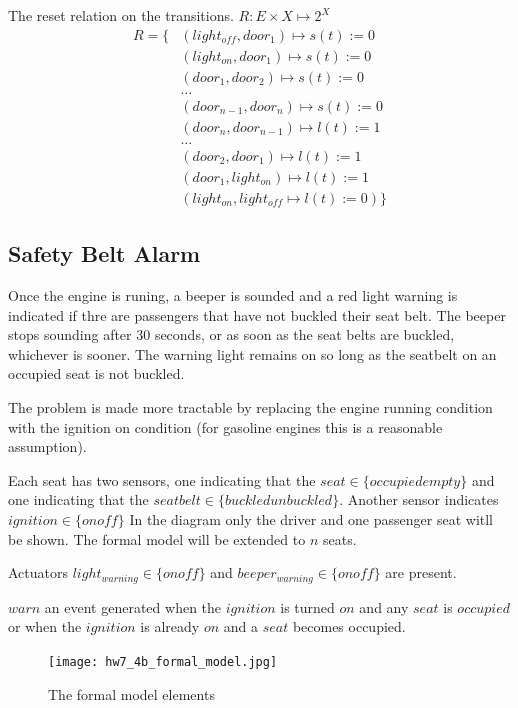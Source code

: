 \documentclass{article}
\begin{document}
The reset relation on the transitions.
$R: E \times X \mapsto 2^X$
\begin{align}
R = \{ & ( light_{off}, door_1 ) \mapsto s(t) := 0 \\
    & ( light_{on}, door_1 ) \mapsto  s(t) := 0 \\
    & ( door_1, door_2 ) \mapsto  s(t) := 0 \\
    & \ldots \\
    & ( door_{n-1}, door_n ) \mapsto  s(t) := 0 \\
    & ( door_n, door_{n-1} ) \mapsto l(t) := 1 \\
    & \ldots \\
    & ( door_2, door_1 ) \mapsto l(t) := 1 \\
    & ( door_1, light_{on} ) \mapsto l(t) := 1 \\
    & ( light_{on}, light_{off} \mapsto l(t) := 0 ) \}
\end{align}

\subsection{Safety Belt Alarm}
Once the engine is runing,
a beeper is sounded and
a red light warning is indicated if thre are
passengers that have not buckled their seat belt.
The beeper stops sounding after 30 seconds, or
as soon as the seat belts are buckled,
whichever is sooner.
The warning light remains on so long as the
seatbelt on an occupied seat is not buckled.

The problem is made more tractable by
replacing the engine running condition with
the ignition on condition (for gasoline engines
this is a reasonable assumption).


Each seat has two sensors, one indicating that
the $seat \in \{occupied empty\}$
and one indicating that the
$seatbelt \in \{buckled unbuckled\}$.
Another sensor indicates
$ignition \in \{on off\}$
In the diagram only the driver and one passenger
seat witll be shown.
The formal model will be extended to $n$ seats.

Actuators $light_{warning} \in \{on off\}$
and $beeper_{warning} \in \{on off\}$ are present.

$warn$ \is an event generated when the $ignition$ is
turned $on$ and any $seat$ is $occupied$ or when
the $ignition$ is already $on$ and a $seat$ becomes
occupied.

\begin{figure}[h!]
\centering
\texttt{[image: hw7\_4b\_formal\_model.jpg]}
\caption{The formal model elements}
\label{fig:4b_formal_model}
\end{figure}
\end{document}
